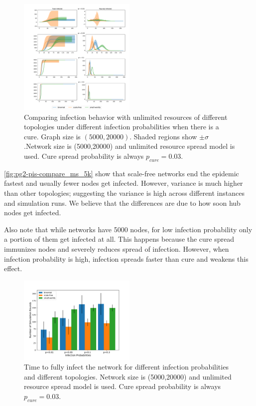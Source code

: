 \documentclass[conference]{IEEEtran}
\begin{document}
\begin{figure}[htb]
  \begin{center}
	\includegraphics[width=0.5\textwidth]{img/pg2-pis-compare_ms_5k.pdf}
  \end{center}
	\caption{Comparing infection behavior with unlimited resources of different topologies under different infection probabilities when there is a cure. Graph  size is $(5000,20000)$. Shaded regions show $\pm \sigma$.Network size is (5000,20000) and unlimited resource spread model is used. Cure spread probability is always $p_{cure} = 0.03$.}
	\label{fig:pg2-pis-compare_ms_5k}
\end{figure}

\autoref{fig:pg2-pis-compare_ms_5k} show that scale-free networks end the epidemic fastest and usually fewer nodes get infected. However, variance is much higher than other topologies; suggesting the variance is high across different instances and simulation runs. We believe that the differences are due to how soon hub nodes get infected.

Also note that while networks have 5000 nodes, for low infection probability only a portion of them get infected at all. This happens because the cure spread immunizes nodes and severely reduces spread of infection. However, when infection probability is high, infection spreads faster than cure and weakens this effect.


\begin{figure}[htb]
  \begin{center}
	\includegraphics[width=0.5\textwidth]{img/pg2-pis-compare_ms_5k_bar.pdf}
  \end{center}
	\caption{Time to fully infect the network for different infection probabilities and different topologies. Network size is (5000,20000) and unlimited resource spread model is used. Cure spread probability is always $p_{cure} = 0.03$.}
	\label{fig:pg2-pis-compare_ms_5k_bar}
\end{figure}
\end{document}
